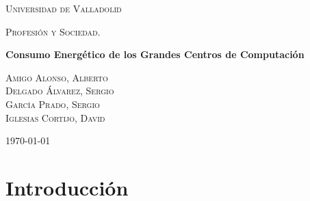 \documentclass[10pt]{article}
\begin{document}
	\begin{titlepage}
      \centering
          {\scshape\LARGE Universidad de Valladolid \par}
          \vspace{1cm}
          {\scshape\Large Profesión y Sociedad.\par}
          \vspace{1.5cm}
          {\huge\bfseries Consumo Energético de los Grandes Centros de Computación \par}
          \vspace{2cm}
          {\large
          \textsc{Amigo Alonso, Alberto}\\[2mm] %
          \textsc{Delgado Álvarez, Sergio}\\[2mm] %
          \textsc{García Prado, Sergio}\\[2mm] %
          \textsc{Iglesias Cortijo, David}\\[2mm] %

          \vspace{-5mm}
          }

          \vfill
		{\large \today\par}
	\end{titlepage}


	\clearpage
	\tableofcontents


	\clearpage
    \section{Introducción}		
    	
        \paragraph{}
    
\end{document}
